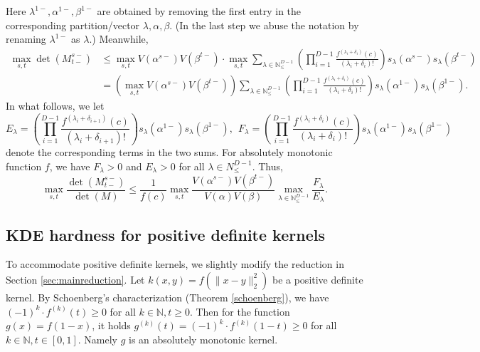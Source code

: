 \documentclass[10pt,a4paper]{article}
\theoremstyle{remark}
\numberwithin{equation}{section}
\numberwithin{theorem}{section}
\newcommand{\N}{\ensuremath{\mathbb{N}}}
\begin{document}
Here $\lambda^{1-}, \alpha^{1-}, \beta^{1-}$ are obtained by removing the first entry in the corresponding partition/vector $\lambda, \alpha, \beta$.
(In the last step we abuse the notation by renaming $\lambda^{1-}$ as $\lambda$.) Meanwhile,
\begin{align*}
\max_{s, t}\det(M_{t-}^{s-}) &\le \max_{s, t} V(\alpha^{s-})V(\beta^{t-}) \cdot
\max_{s, t} \sum_{\lambda \in \N^{D-1}_{\le}}
\left(\prod_{i=1}^{D-1} \frac{f^{(\lambda_i + \delta_i)}(c)}{(\lambda_i + \delta_i)!}\right)
s_{\lambda}(\alpha^{s-})s_{\lambda}(\beta^{t-}) \\
&= \left(\max_{s, t} V(\alpha^{s-})V(\beta^{t-})\right)
\sum_{\lambda \in \N^{D-1}_{\le}}
\left(\prod_{i=1}^{D-1} \frac{f^{(\lambda_i + \delta_i)}(c)}{(\lambda_i + \delta_i)!}\right)
s_{\lambda}(\alpha^{1-})s_{\lambda}(\beta^{1-}).
\end{align*}
In what follows, we let
\[E_\lambda = \left(\prod_{i=1}^{D-1} 
\frac{f^{(\lambda_i + \delta_{i+1})}(c)}{(\lambda_i + \delta_{i+1})!}\right)
s_{\lambda}(\alpha^{1-})s_{\lambda}(\beta^{1-}), ~~
F_\lambda = \left(\prod_{i=1}^{D-1} 
\frac{f^{(\lambda_i + \delta_i)}(c)}{(\lambda_i + \delta_i)!}\right)
s_{\lambda}(\alpha^{1-})s_{\lambda}(\beta^{1-})\]
denote the corresponding terms in the two sums. For absolutely monotonic function $f$, we have $F_\lambda > 0$ and $E_{\lambda} > 0$ for all $\lambda \in N^{D-1}_{\le}$. Thus,
\begin{equation}
\label{eq:detRatio}
\max_{s, t} \frac{\det(M^{s-}_{t-})}{\det(M)}
\le \frac 1{f(c)} \max_{s, t} \frac{V(\alpha^{s-})V(\beta^{t-})}{V(\alpha)V(\beta)}
\max_{\lambda \in \N^{D-1}_{\le}}\frac{F_\lambda}{E_\lambda}.
\end{equation}

\subsection{KDE hardness for positive definite kernels} \label{sec:pdkde}
To accommodate positive definite kernels, we slightly modify the reduction in Section \ref{sec:mainreduction}.
Let $k(x, y) = f(\|x-y\|_2^2)$ be a positive definite kernel. By Schoenberg's characterization (Theorem \ref{schoenberg}), we have $(-1)^k \cdot f^{(k)}(t) \ge 0$ for all $k \in \N, t \ge 0$. Then for the function $g(x) = f(1-x)$, it holds $g^{(k)}(t) = (-1)^k \cdot f^{(k)}(1-t) \ge 0$ for all $k \in \N, t \in [0, 1]$.
Namely $g$ is an absolutely monotonic kernel. 
\end{document}
